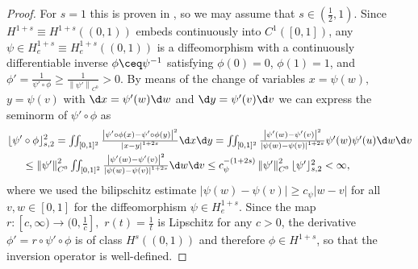 	\begin{proof}
For $s=1$ this is proven in 
\cite[Theorem 1.16]{reiter_2009}, so we may assume that $s\in (\frac{1}{2},1)$.
Since $H^{1+s}\equiv H^{1+s}((0,1))$ 
embeds continuously into $C^1([0,1])$, any 
$\psi\in H^{1+s}_e\equiv H^{1+s}_e((0,1))$ is a diffeomorphism
with a  continuously differentiable inverse $\phi \ceq \psi^{-1}$
satisfying $\phi(0)=0$, $\phi(1)=1$, and $\phi'=\frac{1}{\psi'\circ\phi}\ge 
\frac{1}{\left\|\psi' \right\|_{C^0}}>0$. 
By means of the change of variables $x=\psi(w),$ $y=\psi(v)$ with $
\d x=\psi'(w)\d w$ and $\d y=\psi'(v)\d v$ we can express the seminorm
of $\psi'\circ\phi$ as
\begin{align}
\lfloor\psi' &\circ\phi\rfloor_{s,2}^2
\textstyle
=\iint_{[0,1]^2}\frac{\left|\psi'\circ \phi(x) - \psi'\circ \phi (y) \right|^2}{\left|x-y \right|^{1+2s}}\d x\d y 
= \iint_{[0,1]^2}\frac{\left|\psi'(w) - \psi'(v) \right|^2}{\left|\psi(w)-\psi(v) \right|^{1+2s}}\psi'(w)\psi'(u)\d w\d v\notag\\
&
\textstyle
\le  \left\|\psi' \right\|^2_{C^0}\iint_{[0,1]^2}\frac{\left|\psi'(w) 
- \psi'(v) \right|^2}{\left|\psi(w)-\psi(v) \right|^{1+2s}}\d w\d v\le
c_\psi^{-(1+2s)}\left\|\psi' \right\|^2_{C^0}
\lfloor\psi'\rfloor_{s,2}^2<\infty,\label{eq:erste-chain}
\end{align}
where we used the bilipschitz estimate $|\psi(w)-\psi(v)|\ge c_\psi|w-v|$ 
for
all $v,w\in [0,1]$ for the diffeomorphism $\psi\in H^{1+s}_e$.
Since the map $r:[c,\infty)\to(0,\frac{1}{c}],$ $r(t)=\frac{1}{t}$ 
is Lipschitz for any $c>0$, the derivative $\phi'=r\circ\psi'\circ
\phi$ is of class $H^{s}((0,1))$ and therefore $\phi\in H^{1+s}$, so that
the inversion operator is well-defined. 


\end{proof}
